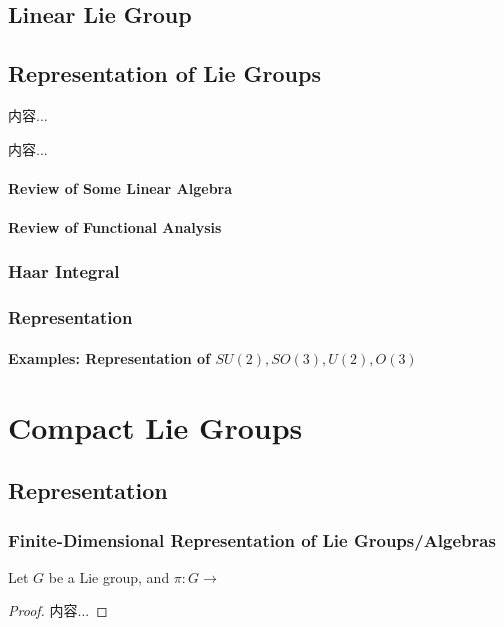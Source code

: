 \documentclass[Total.tex]{subfiles}
\begin{document}
		\section{Linear Lie Group}
		\section{Representation of Lie Groups}
			\begin{Def}
				内容...
			\end{Def}
			
			\begin{theorem}
				内容...
			\end{theorem}
			\subsubsection{Review of Some Linear Algebra}
			\subsubsection{Review of Functional Analysis}
			\subsection{Haar Integral}
			\subsection{Representation}
			
			\subsubsection{Examples: Representation of $SU(2),SO(3),U(2),O(3)$}
	\chapter{Compact Lie Groups}
		\section{Representation}
			\subsection{Finite-Dimensional Representation of Lie Groups/Algebras}
			
				\begin{proposition}
					Let $G$ be a Lie group, and $\pi:G\rightarrow $
				\end{proposition}
				\begin{proof}
					内容...
				\end{proof}
\end{document}
